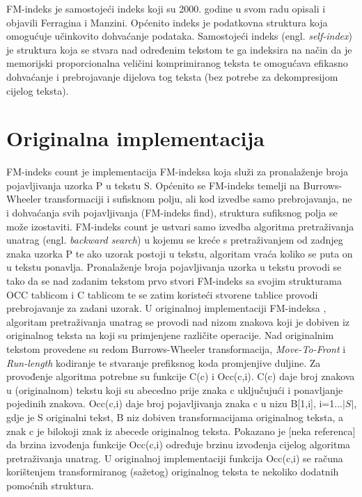 FM-indeks je samostojeći indeks koji su 2000. godine u svom radu opisali i objavili Ferragina i Manzini. Općenito indeks je podatkovna struktura koja omogućuje učinkovito dohvaćanje podataka. Samostojeći indeks (engl. \emph{self-index}) je struktura koja se stvara nad određenim tekstom te ga indeksira na način da je memorijski proporcionalna veličini komprimiranog teksta te omogućava efikasno dohvaćanje i prebrojavanje dijelova tog teksta (bez potrebe za dekompresijom cijelog teksta).


\section{Originalna implementacija}
FM-indeks count je implementacija FM-indeksa koja služi za pronalaženje broja pojavljivanja uzorka P u tekstu S. Općenito se FM-indeks temelji na Burrows-Wheeler transformaciji i sufisknom polju, ali kod izvedbe samo prebrojavanja, ne i dohvaćanja svih pojavljivanja (FM-indeks find), struktura sufiksnog polja se može izostaviti.
FM-indeks count je ustvari samo izvedba algoritma pretraživanja unatrag  (engl. \emph{backward search}) u kojemu se kreće s pretraživanjem od zadnjeg znaka uzorka P te ako uzorak postoji u tekstu, algoritam vraća koliko se puta on u tekstu ponavlja.
Pronalaženje broja pojavljivanja uzorka u tekstu provodi se tako da se nad zadanim tekstom prvo stvori FM-indeks sa svojim strukturama OCC tablicom i C tablicom te se zatim koristeći stvorene tablice provodi prebrojavanje za zadani uzorak.
U originalnoj implementaciji FM-indeksa  \cite{fm1}, algoritam pretraživanja unatrag se provodi nad nizom znakova koji je dobiven iz originalnog teksta na koji su primjenjene različite operacije. Nad originalnim tekstom provedene su redom Burrows-Wheeler transformacija, \emph{Move-To-Front} i \emph{Run-length} kodiranje te stvaranje prefiksnog koda promjenjive duljine.  Za provođenje algoritma potrebne su funkcije C(c) i Occ(c,i). C(c) daje broj znakova u (originalnom) tekstu koji su abecedno prije znaka c uključujući i ponavljanje pojedinih znakova. Occ(c,i) daje broj pojavljivanja znaka c u nizu B[1,i], i=1...$|S|$, gdje je S originalni tekst, B niz dobiven transformacijama originalnog teksta, a znak c je bilokoji znak iz abecede originalnog teksta. Pokazano je [neka referenca] da brzina izvođenja funkcije Occ(c,i) određuje brzinu izvođenja cijelog algoritma pretraživanja unatrag. U originalnoj implementaciji funkcija Occ(c,i) se računa korištenjem transformiranog (sažetog) originalnog teksta te nekoliko dodatnih pomoćnih struktura. 

